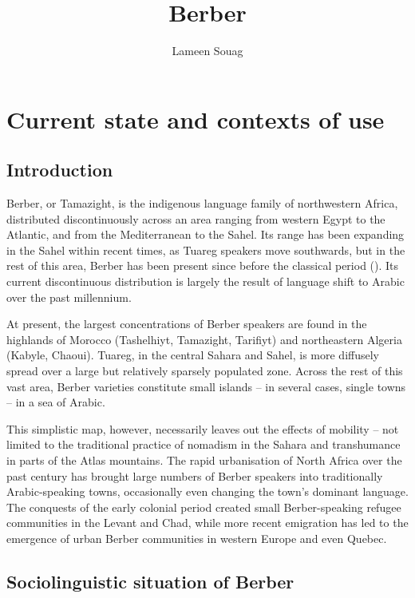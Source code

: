 \documentclass[output=paper]{langsci/langscibook}
\author{Lameen Souag\affiliation{CNRS, LACITO}}
\title{Berber}
\begin{document}
\maketitle 
  


 \section{Current state and contexts of use}


 \subsection{Introduction}


Berber, or Tamazight, is the indigenous language family of northwestern Africa, distributed discontinuously across an area ranging from western Egypt to the Atlantic, and from the Mediterranean to the Sahel. Its range has been expanding in the Sahel within recent times, as Tuareg speakers move southwards, but in the rest of this area, Berber has been present since before the classical period (\citealt{MúrciaSánchez2010}). Its current discontinuous distribution is largely the result of language shift to Arabic over the past millennium.

At present, the largest concentrations of Berber speakers are found in the highlands of Morocco (Tashelhiyt, Tamazight, Tarifiyt) and northeastern Algeria (Kabyle, Chaoui). Tuareg, in the central Sahara and Sahel, is more diffusely spread over a large but relatively sparsely populated zone. Across the rest of this vast area, Berber varieties constitute small islands – in several cases, single towns – in a sea of Arabic.

This simplistic map, however, necessarily leaves out the effects of mobility – not limited to the traditional practice of nomadism in the Sahara and transhumance in parts of the Atlas mountains. The rapid urbanisation of North Africa over the past century has brought large numbers of Berber speakers into traditionally Arabic-speaking towns, occasionally even changing the town's dominant language. The conquests of the early colonial period created small Berber-speaking refugee communities in the Levant and Chad, while more recent emigration has led to the emergence of urban Berber communities in western Europe and even Quebec.


 
 \subsection{Sociolinguistic situation of Berber}
\end{document}
